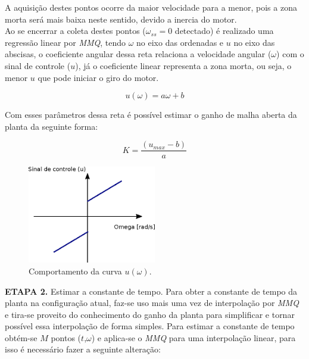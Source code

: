 
A aquisição destes pontos ocorre da maior velocidade para a menor, pois a zona morta será mais baixa neste sentido, devido a inercia do motor.\\

Ao se encerrar a coleta destes pontos ($\omega_{ss} = 0$ detectado) é realizado uma regressão linear por \textit{MMQ}, tendo $\omega$ no eixo das ordenadas e $u$ no eixo das abscisas, o coeficiente angular dessa reta relaciona a velocidade angular ($\omega$) com o sinal de controle ($u$), já o coeficiente linear representa a zona morta, ou seja, o menor $u$ que pode iniciar o giro do motor.

\begin{equation*}
    u(\omega) = a\omega + b
\end{equation*}

Com esses parâmetros dessa reta é possível estimar o ganho de malha aberta da planta da seguinte forma:

\begin{equation*}
    K = \frac{(u_{max} - b)}{a}
\end{equation*}
    
\begin{figure}[H]
    \centering
    \includegraphics[width=0.5\textwidth]{imagens/ilustracoes/omega_x_sinal_controle.eps}
    \caption{Comportamento da curva $u(\omega)$.}
    \label{fig:ilustracao_omega_x_pwm}
\end{figure}    
    
\textbf{ETAPA 2.} Estimar a constante de tempo. Para obter a constante de tempo da planta na configuração atual, faz-se uso mais uma vez de interpolação por \textit{MMQ} e tira-se proveito do conhecimento do ganho da planta para simplificar e tornar possível essa interpolação de forma simples. Para estimar a constante de tempo obtém-se $M$ pontos ($t$,$\omega$) e aplica-se o \textit{MMQ} para uma interpolação linear, para isso é necessário fazer a seguinte alteração:
    

